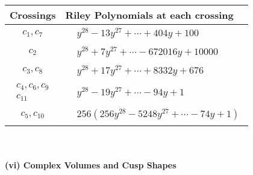 \documentclass[1p]{elsarticle_modified}
\theoremstyle{definition}
\begin{document}
\begin{tabular}{m{50pt}|m{274pt}}
Crossings & \hspace{64pt}Riley Polynomials at each crossing \\
\hline $$\begin{aligned}c_{1},c_{7}\end{aligned}$$&$\begin{aligned}
&y^{28}-13 y^{27}+\cdots+404 y+100
\end{aligned}$\\
\hline $$\begin{aligned}c_{2}\end{aligned}$$&$\begin{aligned}
&y^{28}+7 y^{27}+\cdots-672016 y+10000
\end{aligned}$\\
\hline $$\begin{aligned}c_{3},c_{8}\end{aligned}$$&$\begin{aligned}
&y^{28}+17 y^{27}+\cdots+8332 y+676
\end{aligned}$\\
\hline $$\begin{aligned}c_{4},c_{6},c_{9}\\c_{11}\end{aligned}$$&$\begin{aligned}
&y^{28}-19 y^{27}+\cdots-94 y+1
\end{aligned}$\\
\hline $$\begin{aligned}c_{5},c_{10}\end{aligned}$$&$\begin{aligned}
&256(256 y^{28}-5248 y^{27}+\cdots-74 y+1)
\end{aligned}$\\
\hline
\end{tabular}\\~\\
\newpage\flushleft \textbf{(vi) Complex Volumes and Cusp Shapes}
\end{document}
